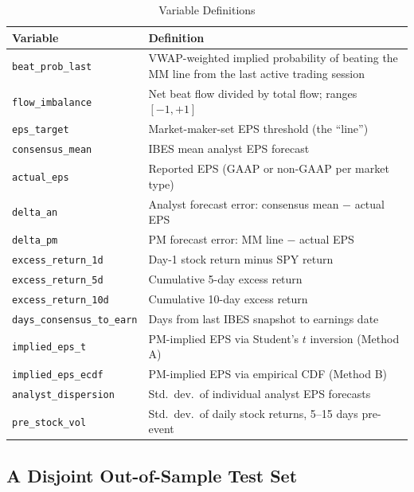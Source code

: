 \documentclass[11pt]{article}
\begin{document}
\begin{table}[htbp]
\centering
\begin{threeparttable}
\caption{Variable Definitions}
\label{tab:variables}
\begin{tabular}{lp{4.2in}}
\toprule
Variable & Definition \\
\midrule
\texttt{beat\_prob\_last} & VWAP-weighted implied probability of beating the MM line from the last active trading session \\
\texttt{flow\_imbalance} & Net beat flow divided by total flow; ranges $[-1, +1]$ \\
\texttt{eps\_target} & Market-maker-set EPS threshold (the ``line'') \\
\texttt{consensus\_mean} & IBES mean analyst EPS forecast \\
\texttt{actual\_eps} & Reported EPS (GAAP or non-GAAP per market type) \\
\texttt{delta\_an} & Analyst forecast error: consensus mean $-$ actual EPS \\
\texttt{delta\_pm} & PM forecast error: MM line $-$ actual EPS \\
\texttt{excess\_return\_1d} & Day-1 stock return minus SPY return \\
\texttt{excess\_return\_5d} & Cumulative 5-day excess return \\
\texttt{excess\_return\_10d} & Cumulative 10-day excess return \\
\texttt{days\_consensus\_to\_earn} & Days from last IBES snapshot to earnings date \\
\texttt{implied\_eps\_t} & PM-implied EPS via Student's $t$ inversion (Method A) \\
\texttt{implied\_eps\_ecdf} & PM-implied EPS via empirical CDF (Method B) \\
\texttt{analyst\_dispersion} & Std.\ dev.\ of individual analyst EPS forecasts \\
\texttt{pre\_stock\_vol} & Std.\ dev.\ of daily stock returns, 5--15 days pre-event \\
\bottomrule
\end{tabular}
\end{threeparttable}
\end{table}

\subsection{A Disjoint Out-of-Sample Test Set} \label{sec:oos_data}
\end{document}

